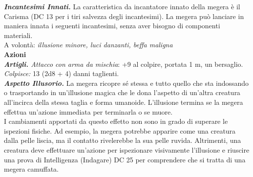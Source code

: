\begin{multicols}{2}
\emph{\textbf{Incantesimi Innati.}} La caratteristica da incantatore innato della megera è il Carisma (DC  13 per i tiri salvezza degli incantesimi). La megera può lanciare in maniera innata i seguenti incantesimi, senza aver bisogno di componenti materiali.\\

A volontà: \emph{illusione minore, luci danzanti, beffa maligna}\\

\smallskip\textbf{Azioni}\\

\emph{\textbf{Artigli.} Attacco con arma da mischia}: +9 al colpire, portata 1 m, un bersaglio.\\

\emph{Colpisce:} 13 (2d8 + 4) danni taglienti.\\

\emph{\textbf{Aspetto Illusorio.}} La megera ricopre sé stessa e tutto quello che sta indossando o trasportando in un'illusione magica che le dona l'aspetto di un'altra creatura all'incirca della stessa taglia e forma umanoide. L'illusione termina se la megera effettua un'azione immediata per terminarla o se muore.\\

I cambiamenti apportati da questo effetto non sono in grado di superare le ispezioni fisiche. Ad esempio, la megera potrebbe apparire come una creatura dalla pelle liscia, ma il contatto rivelerebbe la sua pelle ruvida. Altrimenti, una creatura deve effettuare un'azione per ispezionare visivamente l'illusione e riuscire una prova di Intelligenza (Indagare) DC  25 per comprendere che si tratta di una megera camuffata.\\


\end{multicols}

